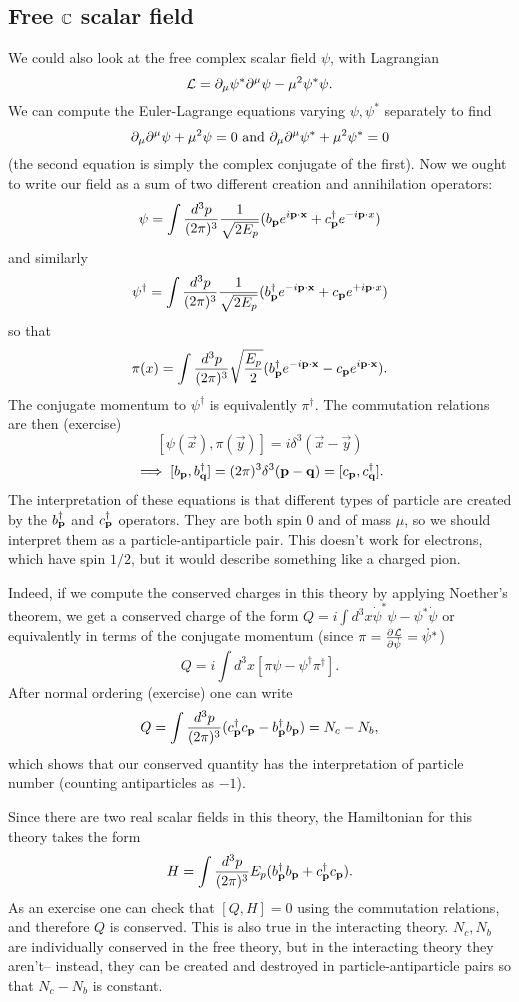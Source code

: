 \subsection*{Free $\mathbb{C}$ scalar field} We could also look at the free complex scalar field $\psi$, with Lagrangian
$$\mathcal L = \partial_\mu \psi^* \partial^\mu \psi - \mu^2 \psi^* \psi.$$
We can compute the Euler-Lagrange equations varying $\psi,\psi^*$ separately to find
$$\partial_\mu \partial^\mu \psi + \mu^2 \psi=0\text{ and }\partial_\mu \partial^\mu \psi^*+\mu^2 \psi^*=0$$
(the second equation is simply the complex conjugate of the first).
Now we ought to write our field as a sum of two different creation and annihilation operators:
$$\psi=\int \frac{d^3p}{(2\pi)^3}\frac{1}{\sqrt{2E_p}} (b_{\boldsymbol{\mathbf{p}}} e^{i \boldsymbol{\mathbf{p}} \cdot \boldsymbol{\mathbf{x}}} + c_{\boldsymbol{\mathbf{p}}}^\dagger e^{-i \boldsymbol{\mathbf{p}} \cdot x})$$
and similarly
$$\psi^\dagger=\int \frac{d^3p}{(2\pi)^3} \frac{1}{\sqrt{2E_p}} (b_{\boldsymbol{\mathbf{p}}}^\dagger e^{-i \boldsymbol{\mathbf{p}} \cdot \boldsymbol{\mathbf{x}}} + c_{\boldsymbol{\mathbf{p}}} e^{+i \boldsymbol{\mathbf{p}} \cdot x})$$
so that
$$\pi(x)=\int \frac{d^3p}{(2\pi)^3} \sqrt{\frac{E_p}{2}} (b_{\boldsymbol{\mathbf{p}}}^\dagger e^{-i \boldsymbol{\mathbf{p}} \cdot \boldsymbol{\mathbf{x}}}-c_{\boldsymbol{\mathbf{p}}} e^{i \boldsymbol{\mathbf{p}} \cdot \boldsymbol{\mathbf{x}}}).$$
The conjugate momentum to $\psi^\dagger$ is equivalently $\pi^\dagger$. The commutation relations are then (exercise)
$$[\psi(\vec x), \pi(\vec y)]=i\delta^3(\vec x - \vec y)$$
$$\implies [b_{\boldsymbol{\mathbf{p}}},b_{\boldsymbol{\mathbf{q}}}^\dagger]=(2\pi)^3 \delta^3 (\boldsymbol{\mathbf{p}} - \boldsymbol{\mathbf{q}})=[c_{\boldsymbol{\mathbf{p}}},c_{\boldsymbol{\mathbf{q}}}^\dagger].$$
The interpretation of these equations is that different types of particle are created by the $b_{\boldsymbol{\mathbf{p}}}^\dagger$ and $c_{\boldsymbol{\mathbf{p}}}^\dagger$ operators. They are both spin $0$ and of mass $\mu$, so we should interpret them as a particle-antiparticle pair. This doesn't work for electrons, which have spin $1/2$, but it would describe something like a charged pion.

Indeed, if we compute the conserved charges in this theory by applying Noether's theorem, we get a conserved charge of the form
$Q=i\int d^3 x \dot \psi^* \psi - \psi^* \dot \psi$ or equivalently in terms of the conjugate momentum (since $\pi = \frac{\partial^{} \mathcal L}{\partial \dot \psi ^{}}=\dot \psi^*$)
$$Q=i\int d^3 x [\pi \psi - \psi^\dagger \pi^\dagger].$$
After normal ordering (exercise) one can write
$$Q=\int \frac{d^3 p}{(2\pi)^3} (c_{\boldsymbol{\mathbf{p}}}^\dagger c_{\boldsymbol{\mathbf{p}}}- b_{\boldsymbol{\mathbf{p}}}^\dagger b_{\boldsymbol{\mathbf{p}}})=N_c-N_b,$$
which shows that our conserved quantity has the interpretation of particle number (counting antiparticles as $-1$).

Since there are two real scalar fields in this theory, the Hamiltonian for this theory takes the form
$$H=\int \frac{d^3p}{(2\pi)^3} E_p(b_{\boldsymbol{\mathbf{p}}}^\dagger b_{\boldsymbol{\mathbf{p}}}+c_{\boldsymbol{\mathbf{p}}}^\dagger c_{\boldsymbol{\mathbf{p}}}).$$
As an exercise one can check that $[Q,H]=0$ using the commutation relations, and therefore $Q$ is conserved. This is also true in the interacting theory. $N_c,N_b$ are individually conserved in the free theory, but in the interacting theory they aren't-- instead, they can be created and destroyed in particle-antiparticle pairs so that $N_c-N_b$ is constant.